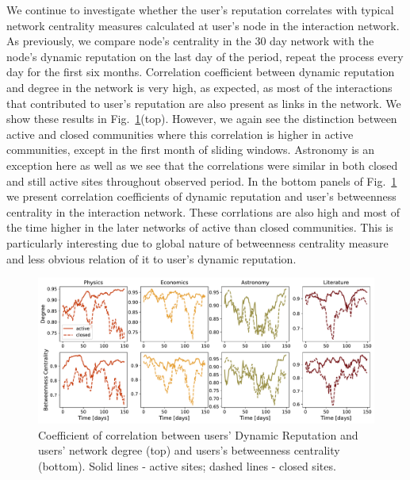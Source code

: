 We continue to investigate whether the user's reputation correlates with typical network centrality measures calculated at user's node in the interaction network. As previously, we compare node's centrality in the 30 day network with the node's dynamic reputation on the last day of the period, repeat the process every day for the first six months. 
Correlation coefficient between dynamic reputation and degree in the network is very high, as expected, as most of the interactions that contributed to user's reputation are also present as links in the network. We show these results in Fig.~\ref{fig:dyn_rep_centrality}(top). However, we again see the distinction between active and closed communities where this correlation is higher in active communities, except in the first month of sliding windows. Astronomy is an exception here as well as we see that the correlations were similar in both closed and still active sites throughout observed period. 
In the bottom panels of Fig.~\ref{fig:dyn_rep_centrality} we present correlation coefficients of dynamic reputation and user's betweenness centrality in the interaction network. These corrlations are also high and most of the time higher in the later networks of active than closed communities. This is particularly interesting due to global nature of betweenness centrality measure and less obvious relation of it to user's dynamic reputation.
\begin{figure}[h!]
	\centering
	\includegraphics[width=\linewidth]{figures/stackexchange/correlations.pdf}
	\caption{Coefficient of correlation between users' Dynamic Reputation and users' network degree (top) and users's betweenness centrality (bottom). Solid lines - active sites; dashed lines - closed sites.}
	\label{fig:dyn_rep_centrality}
\end{figure}













       
